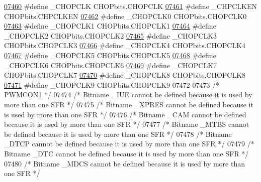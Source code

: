 \begin{DoxyCode}
\hypertarget{a00009_source_l07460}{}\hyperlink{a00009_a4205f5c995280a43b3d94f31b8c36415}{07460} \textcolor{preprocessor}{#define \_CHOPCLK CHOPbits.CHOPCLK}
\hypertarget{a00009_source_l07461}{}\hyperlink{a00009_a997dddeaea698a7b313e3b86a4583d98}{07461} \textcolor{preprocessor}{#define \_CHPCLKEN CHOPbits.CHPCLKEN}
\hypertarget{a00009_source_l07462}{}\hyperlink{a00009_a1280e3bb677b8e7c27cb739196444b75}{07462} \textcolor{preprocessor}{#define \_CHOPCLK0 CHOPbits.CHOPCLK0}
\hypertarget{a00009_source_l07463}{}\hyperlink{a00009_ad569a09248ba6e5cec522bfdc1a406f7}{07463} \textcolor{preprocessor}{#define \_CHOPCLK1 CHOPbits.CHOPCLK1}
\hypertarget{a00009_source_l07464}{}\hyperlink{a00009_ab7a17643f22557f71fb6c665d7720b0e}{07464} \textcolor{preprocessor}{#define \_CHOPCLK2 CHOPbits.CHOPCLK2}
\hypertarget{a00009_source_l07465}{}\hyperlink{a00009_a0d1bd81c21a6984688626b32b919162b}{07465} \textcolor{preprocessor}{#define \_CHOPCLK3 CHOPbits.CHOPCLK3}
\hypertarget{a00009_source_l07466}{}\hyperlink{a00009_a1a39e8b4bb1d01a3f842061d85a9b4b4}{07466} \textcolor{preprocessor}{#define \_CHOPCLK4 CHOPbits.CHOPCLK4}
\hypertarget{a00009_source_l07467}{}\hyperlink{a00009_a688de0cc2d82d352531d224247664873}{07467} \textcolor{preprocessor}{#define \_CHOPCLK5 CHOPbits.CHOPCLK5}
\hypertarget{a00009_source_l07468}{}\hyperlink{a00009_afc4cef605d18f570b746265658e7afa7}{07468} \textcolor{preprocessor}{#define \_CHOPCLK6 CHOPbits.CHOPCLK6}
\hypertarget{a00009_source_l07469}{}\hyperlink{a00009_a762d6e4a9e7f5239f30d4e544aef8fb1}{07469} \textcolor{preprocessor}{#define \_CHOPCLK7 CHOPbits.CHOPCLK7}
\hypertarget{a00009_source_l07470}{}\hyperlink{a00009_a53923da0b57d17586ee8fc6b14820bc1}{07470} \textcolor{preprocessor}{#define \_CHOPCLK8 CHOPbits.CHOPCLK8}
\hypertarget{a00009_source_l07471}{}\hyperlink{a00009_a7a0f719f7dea2b86e554e794b334576a}{07471} \textcolor{preprocessor}{#define \_CHOPCLK9 CHOPbits.CHOPCLK9}
07472 
07473 \textcolor{comment}{/* PWMCON1 */}
07474 \textcolor{comment}{/* Bitname \_IUE cannot be defined because it is used by more than one SFR */}
07475 \textcolor{comment}{/* Bitname \_XPRES cannot be defined because it is used by more than one SFR */}
07476 \textcolor{comment}{/* Bitname \_CAM cannot be defined because it is used by more than one SFR */}
07477 \textcolor{comment}{/* Bitname \_MTBS cannot be defined because it is used by more than one SFR */}
07478 \textcolor{comment}{/* Bitname \_DTCP cannot be defined because it is used by more than one SFR */}
07479 \textcolor{comment}{/* Bitname \_DTC cannot be defined because it is used by more than one SFR */}
07480 \textcolor{comment}{/* Bitname \_MDCS cannot be defined because it is used by more than one SFR */}

\end{DoxyCode}
